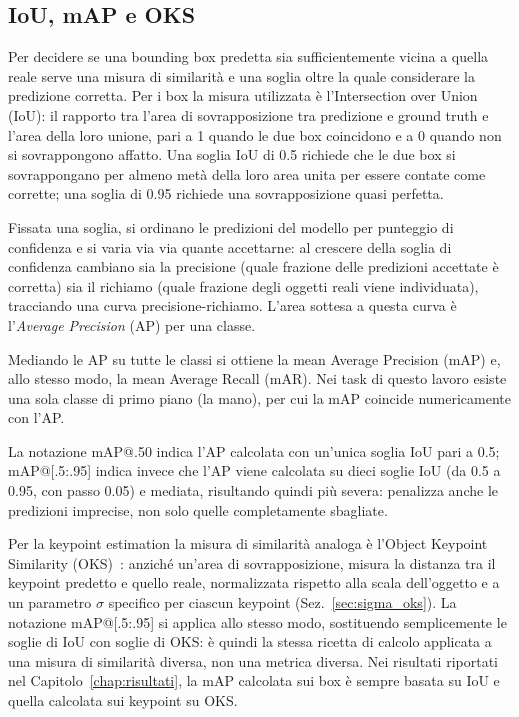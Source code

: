 \subsection{IoU, mAP e OKS}
\label{sec:iou_map}

Per decidere se una bounding box predetta sia sufficientemente vicina a
quella reale serve una misura di similarità e una soglia oltre la quale
considerare la predizione corretta. Per i box la misura utilizzata è
l'Intersection over Union (IoU): il rapporto tra l'area di
sovrapposizione tra predizione e ground truth e l'area della loro
unione, pari a 1 quando le due box coincidono e a 0 quando non si
sovrappongono affatto. Una soglia IoU di 0.5 richiede che le due box si
sovrappongano per almeno metà della loro area unita per essere contate
come corrette; una soglia di 0.95 richiede una sovrapposizione quasi
perfetta.

Fissata una soglia, si ordinano le predizioni del modello per punteggio
di confidenza e si varia via via quante accettarne: al crescere della
soglia di confidenza cambiano sia la precisione (quale frazione delle
predizioni accettate è corretta) sia il richiamo (quale frazione degli
oggetti reali viene individuata), tracciando una curva
precisione-richiamo. L'area sottesa a questa curva è l'\emph{Average
Precision} (AP) per una classe.

Mediando le AP su tutte le classi si ottiene la mean Average Precision
(mAP) e, allo stesso modo, la mean Average Recall (mAR). Nei task di
questo lavoro esiste una sola classe di primo piano (la mano), per cui
la mAP coincide numericamente con l'AP.

La notazione mAP@.50 indica l'AP calcolata con un'unica soglia IoU pari
a 0.5; mAP@[.5:.95] indica invece che l'AP viene calcolata su dieci
soglie IoU (da 0.5 a 0.95, con passo 0.05) e mediata, risultando quindi
più severa: penalizza anche le predizioni imprecise, non solo quelle
completamente sbagliate.

Per la keypoint estimation la misura di similarità analoga è l'Object
Keypoint Similarity (OKS)~\cite{ronchi2017benchmarking}: anziché
un'area di sovrapposizione, misura la distanza tra il keypoint predetto
e quello reale, normalizzata rispetto alla scala dell'oggetto e a un
parametro $\sigma$ specifico per ciascun keypoint
(Sez.~\ref{sec:sigma_oks}). La notazione mAP@[.5:.95] si applica allo
stesso modo, sostituendo semplicemente le soglie di IoU con soglie di
OKS: è quindi la stessa ricetta di calcolo applicata a una misura di
similarità diversa, non una metrica diversa. Nei risultati riportati nel
Capitolo~\ref{chap:risultati}, la mAP calcolata sui box è sempre basata
su IoU e quella calcolata sui keypoint su OKS.

